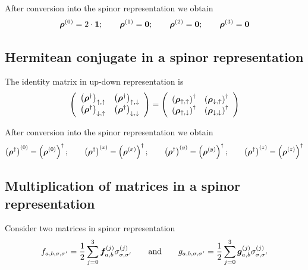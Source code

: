 \documentclass[11pt,a4paper]{report}
\begin{document}
After conversion into the spinor representation we obtain
\begin{eqnarray}
\bm{\rho}^{(0)}=2\cdot\bm{1};\qquad
\bm{\rho}^{(1)}=\bm{0};\qquad
\bm{\rho}^{(2)}=\bm{0};\qquad
\bm{\rho}^{(3)}=\bm{0}
\end{eqnarray}

\subsection{Hermitean conjugate  in a spinor representation}
The identity matrix in up-down representation is
\begin{eqnarray}
\left(\begin{array}{cc}
\left(\bm{\rho}^\dagger\right)_{\uparrow,\uparrow}
&\left(\bm{\rho}^\dagger\right)_{\uparrow,\downarrow}\\
\left(\bm{\rho}^\dagger\right)_{\downarrow,\uparrow}
&\left(\bm{\rho}^\dagger\right)_{\downarrow,\downarrow}\\
\end{array}\right)
=
\left(\begin{array}{cc}
 \left(\bm{\rho}_{\uparrow,\uparrow}    \right)^\dagger
&\left(\bm{\rho}_{\downarrow,\uparrow}  \right)^\dagger\\
 \left(\bm{\rho}_{\uparrow,\downarrow}  \right)^\dagger
&\left(\bm{\rho}_{\downarrow,\downarrow}\right)^\dagger\\
\end{array}\right)
\end{eqnarray}

After conversion into the spinor representation we obtain
\begin{eqnarray}
\left(\bm{\rho}^\dagger\right)^{(0)}=\left(\bm{\rho}^{(0)}\right)^\dagger
;\qquad
\left(\bm{\rho}^\dagger\right)^{(x)}=\left(\bm{\rho}^{(x)}\right)^\dagger
;\qquad
\left(\bm{\rho}^\dagger\right)^{(y)}=\left(\bm{\rho}^{(y)}\right)^\dagger
;\qquad
\left(\bm{\rho}^\dagger\right)^{(z)}=\left(\bm{\rho}^{(z)}\right)^\dagger
\nonumber\\
\end{eqnarray}

\subsection{Multiplication of matrices in a spinor representation}
Consider two matrices in spinor representation
\begin{eqnarray*}
f_{a,b,\sigma,\sigma'}=\frac{1}{2}\sum_{j=0}^3
\bm{f}^{(j)}_{a,b}\sigma^{(j)}_{\sigma,\sigma'}
\qquad\text{and}\qquad
g_{a,b,\sigma,\sigma'}=\frac{1}{2}\sum_{j=0}^3
\bm{g}^{(j)}_{a,b}\sigma^{(j)}_{\sigma,\sigma'}
\end{eqnarray*}
\end{document}
